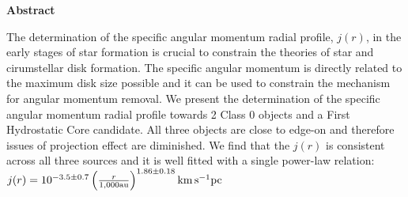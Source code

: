 \textbf{Abstract}

The determination of the specific angular momentum radial profile, $j(r)$, in the early stages of star formation is crucial to constrain the theories of star and cirumstellar disk formation.
The specific angular momentum is directly related to the maximum disk size possible and 
it can be used to constrain the mechanism for angular momentum removal. 
We present the determination of the specific angular momentum radial profile towards 2 Class 0 objects and a First Hydrostatic Core candidate. 
All three objects are close to edge-on and therefore issues of projection effect are diminished. 
We find that the $j(r)$ is consistent across all three sources and it is well fitted with a single power-law relation: 
$j(r) = 10^{-3.5\pm 0.7}\left( \frac{r}{1,000 \textrm{au}}\right)^{1.86\pm0.18} \rm{km\, s^{-1} pc}$
  
  
  